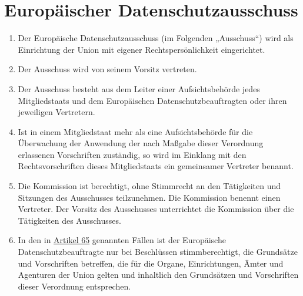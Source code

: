 \chapter{Europäischer Datenschutzausschuss}
\label{ch:68}


\begin{enumerate}

  \item Der Europäische Datenschutzausschuss (im Folgenden „Ausschuss“) wird als Einrichtung der Union mit eigener
   Rechtspersönlichkeit eingerichtet.
  \label{itm:68-1}

  \item Der Ausschuss wird von seinem Vorsitz vertreten.
  \label{itm:68-2}

  \item Der Ausschuss besteht aus dem Leiter einer Aufsichtsbehörde jedes Mitgliedstaats und dem Europäischen
   Datenschutzbeauftragten oder ihren jeweiligen Vertretern.
  \label{itm:68-3}

  \item Ist in einem Mitgliedstaat mehr als eine Aufsichtsbehörde für die Überwachung der Anwendung der nach Maßgabe
   dieser Verordnung erlassenen Vorschriften zuständig, so wird im Einklang mit den Rechtsvorschriften dieses
   Mitgliedstaats ein gemeinsamer Vertreter benannt.
  \label{itm:68-4}

  \item Die Kommission ist berechtigt, ohne Stimmrecht an den Tätigkeiten und Sitzungen des Ausschusses teilzunehmen.
   Die Kommission benennt einen Vertreter. Der Vorsitz des Ausschusses unterrichtet die Kommission über die Tätigkeiten
   des Ausschusses.
  \label{itm:68-5}

  \item In den in \hyperref[ch:65]{Artikel 65} genannten Fällen ist der Europäische Datenschutzbeauftragte nur bei
   Beschlüssen stimmberechtigt, die Grundsätze und Vorschriften betreffen, die für die Organe, Einrichtungen, Ämter und
   Agenturen der Union gelten und inhaltlich den Grundsätzen und Vorschriften dieser Verordnung entsprechen.
  \label{itm:68-6}

\end{enumerate}


